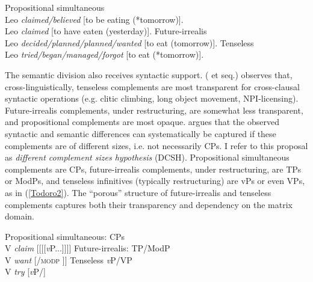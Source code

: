 \documentclass[output=paper]{langscibook}
\begin{document}
\begin{exe}
\ex \label{Todoro1}
\begin{xlist}
\ex \label{Todoro1a}
Propositional simultaneous\\
    Leo \textit{claimed/believed} [to be eating (*tomorrow)].\\
    Leo \textit{claimed} [to have eaten (yesterday)].
\ex \label{Todoro1b}
Future-irrealis\\
Leo \textit{decided/planned/planned/wanted} [to eat	(tomorrow)].
\ex \label{Todoro1c}
Tenseless\\
    Leo \textit{tried/began/managed/forgot} [to eat (*tomorrow)].	\\
    \hfill \citep{wurmbrand2014a}
\end{xlist}
\end{exe}\largerpage[2]

\begin{sloppypar}
The semantic division also receives syntactic support. \citeauthor{wurmbrand2001a} (\citeyear{wurmbrand2001a} et seq.) observes that, cross-linguistically, tenseless complements are most transparent for cross-clausal syntactic operations (e.g. clitic climbing, long object movement, NPI-licensing). Future-irrealis complements, under restructuring, are somewhat less transparent, and propositional complements are most opaque. \citeauthor{wurmbrand2001a} argues that the observed syntactic and semantic differences can systematically be captured if these complements are of different sizes, i.e. not necessarily CPs. I refer to this proposal as \emph{different complement sizes hypothesis} (DCSH). Propositional simultaneous complements are CPs, future-irrealis complements, under restructuring, are TPs or ModPs, and tenseless infinitives (typically restructuring) are vPs or even VPs, as in (\ref{Todoro2}). The ``porous'' structure of future-irrealis and tenseless complements captures both their transparency and dependency on the matrix domain.
\end{sloppypar}

\begin{exe}
\ex \label{Todoro2}
\begin{xlist}
\ex \label{Todoro2a}
Propositional simultaneous: CPs \\
    V \emph{claim} [{\CP}[{\tp}[{\aspp}[{\textit{v}P}...]]]]
\ex \label{Todoro2b}
Future-irrealis: TP/ModP \\
V \emph{want} [\tp/\textsc{modp} \woll [\aspp[\textit{v}P...]]]
\ex \label{Todoro2c}
Tenseless \textit{v}P/VP \\
V \emph{try} [\textit{v}P/\vp]
\end{xlist}
\end{exe}
\end{document}
